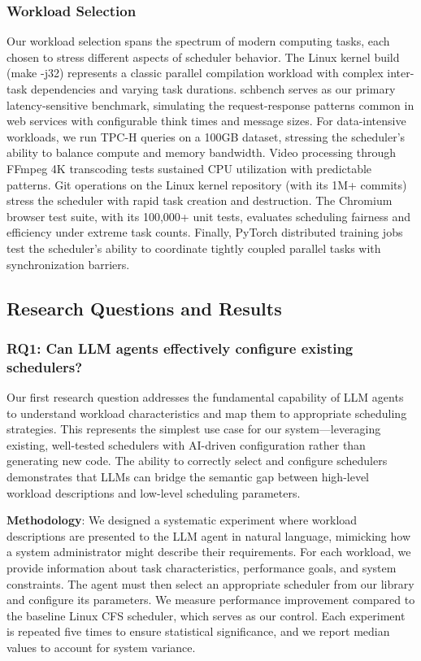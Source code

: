\subsubsection{Workload Selection}
Our workload selection spans the spectrum of modern computing tasks, each chosen to stress different aspects of scheduler behavior. The Linux kernel build (make -j32) represents a classic parallel compilation workload with complex inter-task dependencies and varying task durations. schbench serves as our primary latency-sensitive benchmark, simulating the request-response patterns common in web services with configurable think times and message sizes. For data-intensive workloads, we run TPC-H queries on a 100GB dataset, stressing the scheduler's ability to balance compute and memory bandwidth. Video processing through FFmpeg 4K transcoding tests sustained CPU utilization with predictable patterns. Git operations on the Linux kernel repository (with its 1M+ commits) stress the scheduler with rapid task creation and destruction. The Chromium browser test suite, with its 100,000+ unit tests, evaluates scheduling fairness and efficiency under extreme task counts. Finally, PyTorch distributed training jobs test the scheduler's ability to coordinate tightly coupled parallel tasks with synchronization barriers.

\subsection{Research Questions and Results}

\subsubsection{RQ1: Can LLM agents effectively configure existing schedulers?}

Our first research question addresses the fundamental capability of LLM agents to understand workload characteristics and map them to appropriate scheduling strategies. This represents the simplest use case for our system—leveraging existing, well-tested schedulers with AI-driven configuration rather than generating new code. The ability to correctly select and configure schedulers demonstrates that LLMs can bridge the semantic gap between high-level workload descriptions and low-level scheduling parameters.

\textbf{Methodology}: We designed a systematic experiment where workload descriptions are presented to the LLM agent in natural language, mimicking how a system administrator might describe their requirements. For each workload, we provide information about task characteristics, performance goals, and system constraints. The agent must then select an appropriate scheduler from our library and configure its parameters. We measure performance improvement compared to the baseline Linux CFS scheduler, which serves as our control. Each experiment is repeated five times to ensure statistical significance, and we report median values to account for system variance.

